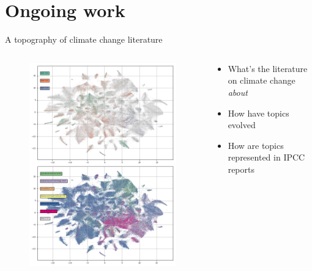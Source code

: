 \documentclass[9pt]{beamer}
\begin{document}
\section{Ongoing work}


\begin{frame}{A topography of climate change literature}

\begin{columns}
	\begin{column}{0.5\linewidth}
		\begin{figure}
			\includegraphics[width=\linewidth]{images/run_665_s_0_p200_double}
		\end{figure}
	\end{column}
	\begin{column}{0.5\linewidth}
		\begin{itemize}
			\item What's the literature on climate change \textit{about}
			\item How have topics evolved
			\item How are topics represented in IPCC reports
		\end{itemize}
	\end{column}
\end{columns}



\end{frame}
\end{document}

